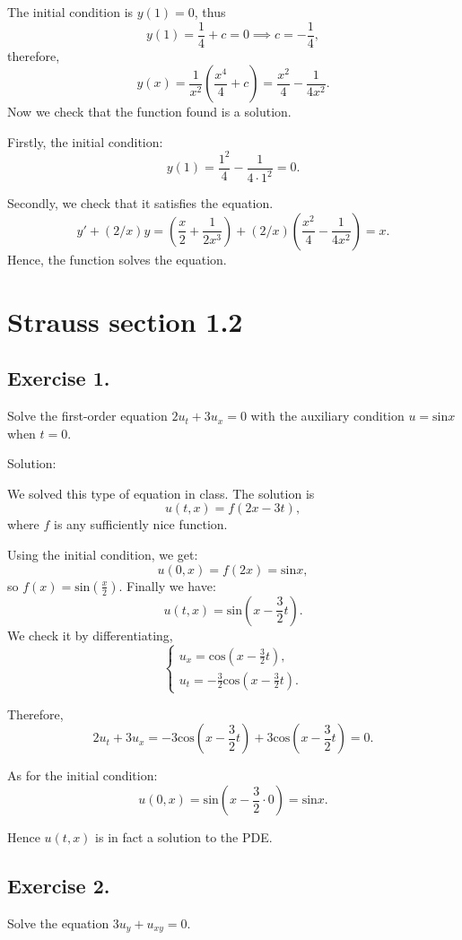 \documentclass{article}
\begin{document}
		The initial condition is $y(1)=0$, thus \[ y(1)=\frac{1}{4} + c= 0 \implies c=-\frac{1}{4},\]
		therefore,
		\[y(x) = \frac{1}{x^2}\left(\frac{x^4}{4}+c\right) = \frac{x^2}{4} - \frac{1}{4x^2}.\]
		Now we check that the function found is a solution.

		Firstly, the initial condition:
		\[y(1)= \frac{1^2}{4} - \frac{1}{4\cdot 1^2} =0.\]

		Secondly, we check that it satisfies the equation.
		\[y'+(2/x)y = \left(\frac{x}{2} + \frac{1}{2x^3}\right) +(2/x)\left(\frac{x^2}{4} - \frac{1}{4x^2}\right) = x.\]
		Hence, the function solves the equation.

\section{Strauss section 1.2}
\subsection{Exercise 1.}
			Solve the first-order equation
			$2u_t +3u_ x =0$ with the auxiliary condition $u=\text{sin}x$ when $t=0.$

			Solution:

			We solved this type of equation in class.
			The solution is 
			\[ u(t,x)=f(2x-3t),\]
			where $f$ is any sufficiently nice function.

			Using the initial condition, we get:
			\[u(0,x)=f(2x)=\text{sin}x,\]
			so $f(x)=\text{sin}\left(\frac{x}{2}\right)$.
			Finally we have:
			\[u(t,x)=\text{sin}\left(x-\frac{3}{2}t\right).\]
			We check it by differentiating,
			\begin{equation*}
				\begin{cases}
					u_x=\text{cos}\left(x-\frac{3}{2}t\right),
					\\
					u_t=-\frac{3}{2}\text{cos}\left(x-\frac{3}{2}t\right).
				\end{cases}
			\end{equation*}

			Therefore,
			\[ 2u_t +3u_x=-3\text{cos}\left(x-\frac{3}{2}t\right) + 3\text{cos}\left(x-\frac{3}{2}t\right)=0.\]

			As for the initial condition:
			\[u(0,x)=\text{sin}\left(x-\frac{3}{2}\cdot0\right)=\text{sin}x.\]

			Hence $u(t,x)$ is in fact a solution to the PDE.

		\subsection{Exercise 2.}
		Solve the equation $3u_y + u_{xy} =0.$
\end{document}
